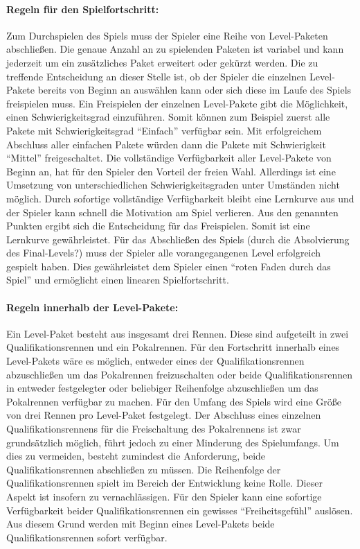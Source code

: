 		\paragraph{Regeln für den Spielfortschritt:}
		Zum Durchspielen des Spiels muss der Spieler eine Reihe von Level-Paketen abschließen. Die genaue Anzahl an zu spielenden Paketen ist variabel und kann jederzeit um ein zusätzliches Paket erweitert oder gekürzt werden. Die zu treffende Entscheidung an dieser Stelle ist, ob der Spieler die einzelnen Level-Pakete bereits von Beginn an auswählen kann oder sich diese im Laufe des Spiels freispielen muss. Ein Freispielen der einzelnen Level-Pakete gibt die Möglichkeit, einen Schwierigkeitsgrad einzuführen. Somit können zum Beispiel zuerst alle Pakete mit Schwierigkeitsgrad \enquote{Einfach} verfügbar sein. Mit erfolgreichem Abschluss aller einfachen Pakete würden dann die Pakete mit Schwierigkeit \enquote{Mittel} freigeschaltet.
		Die vollständige Verfügbarkeit aller Level-Pakete von Beginn an, hat für den Spieler den Vorteil der freien Wahl. Allerdings ist eine Umsetzung von unterschiedlichen Schwierigkeitsgraden unter Umständen nicht möglich. Durch sofortige vollständige Verfügbarkeit bleibt eine Lernkurve aus und der Spieler kann schnell die Motivation am Spiel verlieren.
		Aus den genannten Punkten ergibt sich die Entscheidung für das Freispielen. Somit ist eine Lernkurve gewährleistet. Für das Abschließen des Spiels (durch die Absolvierung des Final-Levels?) muss der Spieler alle vorangegangenen Level erfolgreich gespielt haben. Dies gewährleistet dem Spieler einen \enquote{roten Faden durch das Spiel} und ermöglicht einen linearen Spielfortschritt.

		\paragraph{Regeln innerhalb der Level-Pakete:}
		Ein Level-Paket besteht aus insgesamt drei Rennen. Diese sind aufgeteilt in zwei Qualifikationsrennen und ein Pokalrennen. Für den Fortschritt innerhalb eines Level-Pakets wäre es möglich, entweder eines der Qualifikationsrennen abzuschließen um das Pokalrennen freizuschalten oder beide Qualifikationsrennen in entweder festgelegter oder beliebiger Reihenfolge abzuschließen um das Pokalrennen verfügbar zu machen.
		Für den Umfang des Spiels wird eine Größe von drei Rennen pro Level-Paket festgelegt. Der Abschluss eines einzelnen Qualifikationsrennens für die Freischaltung des Pokalrennens ist zwar grundsätzlich möglich, führt jedoch zu einer Minderung des Spielumfangs. Um dies zu vermeiden, besteht zumindest die Anforderung, beide Qualifikationsrennen abschließen zu müssen. Die Reihenfolge der Qualifikationsrennen spielt im Bereich der Entwicklung keine Rolle. Dieser Aspekt ist insofern zu vernachlässigen. Für den Spieler kann eine sofortige Verfügbarkeit beider Qualifikationsrennen ein gewisses \enquote{Freiheitsgefühl} auslösen. Aus diesem Grund werden mit Beginn eines Level-Pakets beide Qualifikationsrennen sofort verfügbar.

